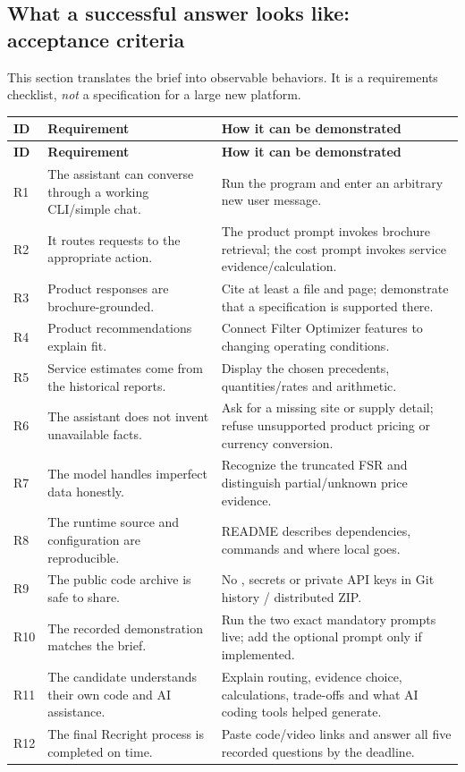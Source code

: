 \documentclass[11pt,a4paper]{article}
\DeclareRobustCommand{\code}[1]{{\ttfamily\small\detokenize{#1}}}
\begin{document}
\subsection{What a successful answer looks like: acceptance criteria}
This section translates the brief into observable behaviors. It is a requirements checklist, \emph{not} a specification for a large new platform.

\begin{longtable}{@{}L{13mm}L{56mm}L{79mm}@{}}
\toprule\textbf{ID} & \textbf{Requirement} & \textbf{How it can be demonstrated}\\\midrule\endfirsthead
\toprule\textbf{ID} & \textbf{Requirement} & \textbf{How it can be demonstrated}\\\midrule\endhead
R1 & The assistant can converse through a working CLI/simple chat. & Run the program and enter an arbitrary new user message.\\
R2 & It routes requests to the appropriate action. & The product prompt invokes brochure retrieval; the cost prompt invokes service evidence/calculation.\\
R3 & Product responses are brochure-grounded. & Cite at least a file and page; demonstrate that a specification is supported there.\\
R4 & Product recommendations explain fit. & Connect Filter Optimizer features to changing operating conditions.\\
R5 & Service estimates come from the historical reports. & Display the chosen precedents, quantities/rates and arithmetic.\\
R6 & The assistant does not invent unavailable facts. & Ask for a missing site or supply detail; refuse unsupported product pricing or currency conversion.\\
R7 & The model handles imperfect data honestly. & Recognize the truncated FSR and distinguish partial/unknown price evidence.\\
R8 & The runtime source and configuration are reproducible. & README describes dependencies, commands and where local \code{data/} goes.\\
R9 & The public code archive is safe to share. & No \code{data/}, secrets or private API keys in Git history / distributed ZIP.\\
R10 & The recorded demonstration matches the brief. & Run the two exact mandatory prompts live; add the optional prompt only if implemented.\\
R11 & The candidate understands their own code and AI assistance. & Explain routing, evidence choice, calculations, trade-offs and what AI coding tools helped generate.\\
R12 & The final Recright process is completed on time. & Paste code/video links and answer all five recorded questions by the deadline.\\
\bottomrule
\end{longtable}
\end{document}
